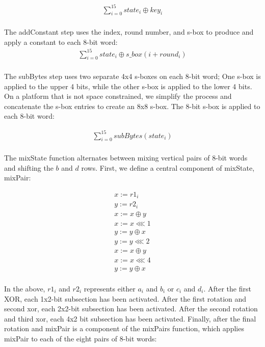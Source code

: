 \documentclass[preprint]{iacrtrans}
\begin{document}
\begin{align}
\displaystyle\sum_{i=0}^{15} state_i \oplus key_i
\end{align}\\

 The addConstant step uses the index, round number, and s-box to produce and apply a constant to each 8-bit word:
\begin{align}
\displaystyle\sum_{i=0}^{15} state_i \oplus s\_box(i + round_i)
\end{align}\\

The subBytes step uses two separate 4x4 s-boxes on each 8-bit word; One s-box is applied to the upper 4 bits, while the other s-box is applied to the lower 4 bits. On a platform that is not space constrained, we simplify the process and concatenate the s-box entries to create an 8x8 s-box. The 8-bit s-box is applied to each 8-bit word:

\begin{align}
\displaystyle\sum_{i=0}^{15} subBytes(state_i)
\end{align}\\

The mixState function alternates between mixing vertical pairs of 8-bit words and shifting the $b$ and $d$ rows. First, we define a central component of mixState, mixPair:

\begin{align}
x := r1_i \\
y := r2_i \\
x := x \oplus y \\
x := x \lll 1 \\
y := y \oplus x \\
y := y \lll 2 \\
x := x \oplus y \\
x := x \lll 4 \\
y := y \oplus x \\
\end{align}

In the above, $r1_i$ and $r2_i$ represents either $a_i$ and $b_i$ or $c_i$ and $d_i$. After the first XOR, each 1x2-bit subsection has been activated. After the first rotation and second xor, each 2x2-bit subsection has been activated. After the second rotation and third xor, each 4x2 bit subsection has been activated. Finally, after the final rotation and  mixPair is a component of the mixPairs function, which applies mixPair to each of the eight pairs of 8-bit words:
\end{document}
